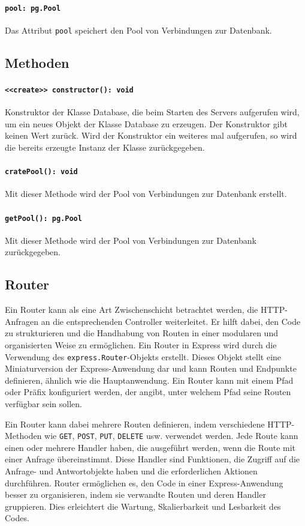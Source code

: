 \documentclass{entwurfsheft}
\begin{document}
\paragraph{\texttt{pool: pg.Pool}}
Das Attribut \texttt{pool} speichert den Pool von Verbindungen zur Datenbank.
\subsection*{Methoden}
\paragraph{\texttt{<<create>> constructor(): void}}
Konstruktor der Klasse Database, die beim Starten des Servers aufgerufen wird, um ein neues Objekt der Klasse Database zu erzeugen. Der Konstruktor gibt keinen Wert zurück.
Wird der Konstruktor ein weiteres mal aufgerufen, so wird die bereits erzeugte Instanz der Klasse zurückgegeben.
\paragraph{\texttt{cratePool(): void}}
Mit dieser Methode wird der Pool von Verbindungen zur Datenbank erstellt.
\paragraph{\texttt{getPool(): pg.Pool}}
Mit dieser Methode wird der Pool von Verbindungen zur Datenbank zurückgegeben.


\subsection{Router}
Ein Router kann als eine Art Zwischenschicht betrachtet werden, die HTTP-Anfragen an die entsprechenden Controller weiterleitet.
Er hilft dabei, den Code zu strukturieren und die Handhabung von Routen in einer modularen und organisierten Weise zu ermöglichen.
Ein Router in Express wird durch die Verwendung des \texttt{express.Router}-Objekts erstellt.
Dieses Objekt stellt eine Miniaturversion der Express-Anwendung dar und kann Routen und Endpunkte definieren, ähnlich wie die Hauptanwendung.
Ein Router kann mit einem Pfad oder Präfix konfiguriert werden, der angibt, unter welchem Pfad seine Routen verfügbar sein sollen.

Ein Router kann dabei mehrere Routen definieren, indem verschiedene HTTP-Methoden wie \texttt{GET}, \texttt{POST}, \texttt{PUT}, \texttt{DELETE} usw. verwendet werden.
Jede Route kann einen oder mehrere Handler haben, die ausgeführt werden, wenn die Route mit einer Anfrage übereinstimmt.
Diese Handler sind Funktionen, die Zugriff auf die Anfrage- und Antwortobjekte haben und die erforderlichen Aktionen durchführen.
Router ermöglichen es, den Code in einer Express-Anwendung besser zu organisieren, indem sie verwandte Routen und deren Handler gruppieren.
Dies erleichtert die Wartung, Skalierbarkeit und Lesbarkeit des Codes.
\end{document}
